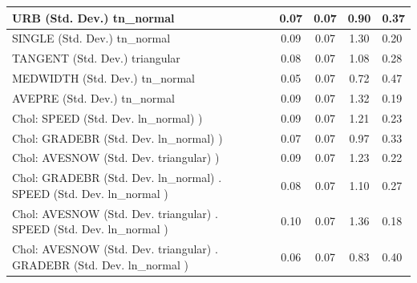 \begin{table}
\begin{center}
\begin{tabular}{|l|l|c|c|c|l|}
			\hline
			URB (Std. Dev.) tn_normal &  & 0.07 & 0.07 & 0.90 & 0.37 \\
			\hline
			SINGLE (Std. Dev.) tn_normal &  & 0.09 & 0.07 & 1.30 & 0.20 \\
			\hline
			TANGENT (Std. Dev.) triangular &  & 0.08 & 0.07 & 1.08 & 0.28 \\
			\hline
			MEDWIDTH (Std. Dev.) tn_normal &  & 0.05 & 0.07 & 0.72 & 0.47 \\
			\hline
			AVEPRE (Std. Dev.) tn_normal &  & 0.09 & 0.07 & 1.32 & 0.19 \\
			\hline
			 Chol: SPEED (Std. Dev. ln_normal) ) &  & 0.09 & 0.07 & 1.21 & 0.23 \\
			\hline
			 Chol: GRADEBR (Std. Dev. ln_normal) ) &  & 0.07 & 0.07 & 0.97 & 0.33 \\
			\hline
			 Chol: AVESNOW (Std. Dev. triangular) ) &  & 0.09 & 0.07 & 1.23 & 0.22 \\
			\hline
			 Chol: GRADEBR (Std. Dev. ln_normal) . SPEED (Std. Dev.   ln_normal ) &  & 0.08 & 0.07 & 1.10 & 0.27 \\
			\hline
			 Chol: AVESNOW (Std. Dev. triangular) . SPEED (Std. Dev.   ln_normal ) &  & 0.10 & 0.07 & 1.36 & 0.18 \\
			\hline
			 Chol: AVESNOW (Std. Dev. triangular) . GRADEBR (Std. Dev.   ln_normal ) &  & 0.06 & 0.07 & 0.83 & 0.40 \\
			\hline
		\end{tabular}
	\end{center}
\end{table}
